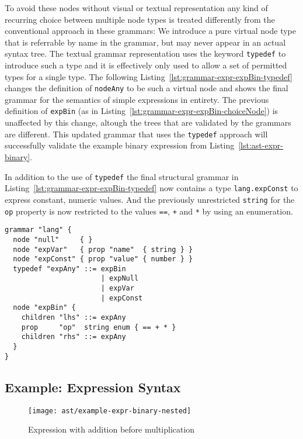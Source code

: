 \documentclass[sigconf,natbib=false]{acmart}
\newcommand\astScale{0.7}
\begin{document}
To avoid these nodes without visual or textual representation any kind of recurring choice between multiple node types is treated differently from the conventional approach in these grammars: We introduce a pure virtual node type that is referrable by name in the grammar, but may never appear in an actual syntax tree. The textual grammar representation uses the keyword \texttt{typedef} to introduce such a type and it is effectively only used to allow a set of permitted types for a single type. The following Listing~\ref{lst:grammar-expr-expBin-typedef} changes the definition of \texttt{nodeAny} to be such a virtual node and shows the final grammar for the semantics of simple expressions in entirety. The previous definition of \texttt{expBin} (as in Listing~\ref{lst:grammar-expr-expBin-choiceNode}) is unaffected by this change, altough the trees that are validated by the grammars are different. This updated grammar that uses the \texttt{typedef} approach will successfully validate the example binary expression from Listing~\ref{lst:ast-expr-binary}.

In addition to the use of \texttt{typedef} the final structural grammar in Listing~\ref{lst:grammar-expr-expBin-typedef} now contains a type \texttt{lang.expConst} to express constant, numeric values. And the previously unrestricted \texttt{string} for the \texttt{op} property is now restricted to the values \texttt{==}, \texttt{+} and \texttt{*} by using an enumeration.

\begin{lstlisting}[caption={Final structural grammar for expressions}, label=lst:grammar-expr-expBin-typedef]
grammar "lang" {
  node "null"     { }
  node "expVar"   { prop "name"  { string } }
  node "expConst" { prop "value" { number } }
  typedef "expAny" ::= expBin
                       | expNull
                       | expVar
                       | expConst
  node "expBin" {
    children "lhs" ::= expAny
    prop     "op"  string enum { == + * }
    children "rhs" ::= expAny
  }
}
\end{lstlisting}

\subsection{Example: Expression Syntax}

\begin{figure}
  \texttt{[image: ast/example-expr-binary-nested]}
  \caption{Expression with addition before multiplication}
  \label{fig:ast-nested-ambiguous}
\end{figure}
\end{document}
